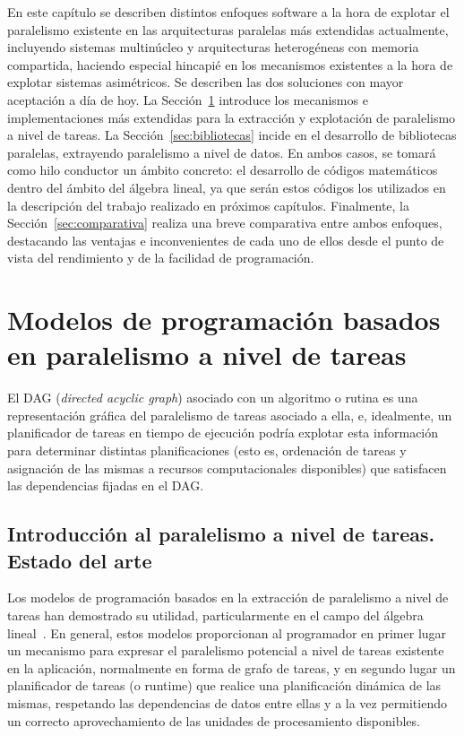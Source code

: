 En este capítulo se describen distintos enfoques software a la hora de
explotar el paralelismo existente en las arquitecturas paralelas más
extendidas actualmente, incluyendo sistemas multinúcleo y arquitecturas
heterogéneas con memoria compartida, haciendo especial hincapié en los
mecanismos existentes a la hora de explotar sistemas asimétricos. Se
describen las dos soluciones con mayor aceptación a día de hoy.  La
Sección~\ref{sec:tareas} introduce los mecanismos e implementaciones más
extendidas para la extracción y explotación de paralelismo a nivel de
tareas.  La Sección~\ref{sec:bibliotecas} incide en el desarrollo de
bibliotecas paralelas, extrayendo paralelismo a nivel de datos.  En ambos
casos, se tomará como hilo conductor un ámbito concreto: el desarrollo de
códigos matemáticos dentro del ámbito del álgebra lineal, ya que serán
estos códigos los utilizados en la descripción del trabajo realizado en
próximos capítulos.  Finalmente, la Sección~\ref{sec:comparativa} realiza
una breve comparativa entre ambos enfoques, destacando las ventajas e
inconvenientes de cada uno de ellos desde el punto de vista del rendimiento
y de la facilidad de programación.


\section{Modelos de programación basados en paralelismo a nivel de tareas}
\label{sec:tareas}

El DAG (\emph{directed acyclic graph}) asociado con un algoritmo o rutina es
una representación gráfica del paralelismo de tareas asociado a ella, e,
idealmente, un planificador de tareas en tiempo de ejecución podría
explotar esta información para determinar distintas planificaciones (esto
es, ordenación de tareas y asignación de las mismas a recursos
computacionales disponibles) que satisfacen las dependencias fijadas en el
DAG.

\subsection{Introducción al paralelismo a nivel de tareas. Estado del arte}

Los modelos de programación basados en la extracción de paralelismo a nivel
de tareas han demostrado su utilidad, particularmente en el campo del
álgebra lineal~\cite{Abalenkovs}. En general, estos modelos proporcionan al
programador en primer lugar un mecanismo para expresar el paralelismo
potencial a nivel de tareas existente en la aplicación, normalmente en
forma de grafo de tareas, y en segundo lugar un planificador de tareas (o
runtime) que realice una planificación dinámica de las mismas, respetando
las dependencias de datos entre ellas y a la vez permitiendo un correcto
aprovechamiento de las unidades de procesamiento disponibles.


